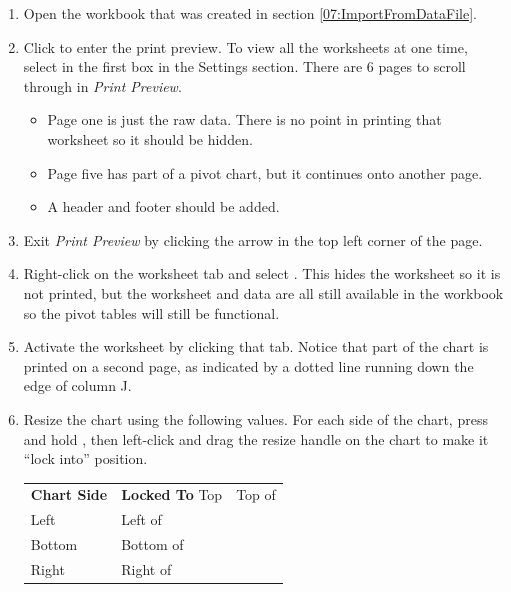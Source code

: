 \begin{enumbox}
	\begin{enumerate}
		\item Open the  workbook that was created in section \ref{07:ImportFromDataFile}.
		\item Click  to enter the print preview. To view all the worksheets at one time, select  in the first box in the Settings section. There are $ 6 $ pages to scroll through in \textit{Print Preview}. 
	
		\begin{itemize}
			\item Page one is just the raw data. There is no point in printing that worksheet so it should be hidden.
			\item Page five has part of a pivot chart, but it continues onto another page.
			\item A header and footer should be added.
		\end{itemize}
	
		\item Exit \textit{Print Preview} by clicking the arrow in the top left corner of the page.
		\item Right-click on the  worksheet tab and select . This hides the worksheet so it is not printed, but the worksheet and data are all still available in the workbook so the pivot tables will still be functional.
		\item Activate the  worksheet by clicking that tab. Notice that part of the chart is printed on a second page, as indicated by a dotted line running down the edge of column J. 
		\item Resize the chart using the following values. For each side of the chart, press and hold , then left-click and drag the resize handle on the chart to make it ``lock into'' position.
	
		\begin{table}[H]
		\captionsetup{labelformat=empty} %
		{\small
			\begin{longtable}{R{0.75in}L{1.50in}} %
				\textbf{Chart Side} & \textbf{Locked To} \endhead
				\hline
				Top & Top of \\
				Left & Left of \\
				Bottom & Bottom of \\
				Right & Right of \\
			\end{longtable}
		} %
		\end{table}


\end{enumerate}
\end{enumbox}
